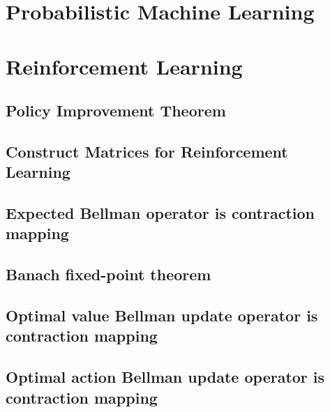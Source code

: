 \section {Probabilistic Machine Learning}

\section{Reinforcement Learning}

\subsection{Policy Improvement Theorem}
\label{appendix-2:policy-im}



\subsection{Construct Matrices for Reinforcement Learning}
\label{appendix-2:metrics-rl}

\subsection{Expected Bellman operator is contraction mapping}
\label{appendix-2:expect-bellman-contract}

\subsection{Banach fixed-point theorem}
\label{appendix-2:fixed-point}

\subsection{Optimal value Bellman update operator is contraction mapping}
\label{appendix-2:optimal-val-bellman-contract}

\subsection{Optimal action Bellman update operator is contraction mapping}
\label{appendix-2:optimal-q-bellman-contract}